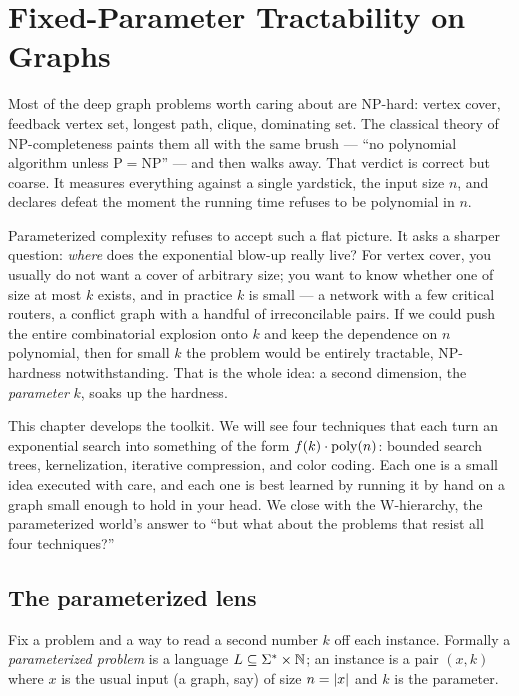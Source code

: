 \chapter{Fixed-Parameter Tractability on Graphs}

Most of the deep graph problems worth caring about are NP-hard: vertex cover, feedback vertex set, longest path, clique, dominating set. The classical theory of NP-completeness paints them all with the same brush --- ``no polynomial algorithm unless P${}={}$NP'' --- and then walks away. That verdict is correct but coarse. It measures everything against a single yardstick, the input size $n$, and declares defeat the moment the running time refuses to be polynomial in $n$.

Parameterized complexity refuses to accept such a flat picture. It asks a sharper question: \emph{where} does the exponential blow-up really live? For vertex cover, you usually do not want a cover of arbitrary size; you want to know whether one of size at most $k$ exists, and in practice $k$ is small --- a network with a few critical routers, a conflict graph with a handful of irreconcilable pairs. If we could push the entire combinatorial explosion onto $k$ and keep the dependence on $n$ polynomial, then for small $k$ the problem would be entirely tractable, NP-hardness notwithstanding. That is the whole idea: a second dimension, the \emph{parameter} $k$, soaks up the hardness.

This chapter develops the toolkit. We will see four techniques that each turn an exponential search into something of the form $f(k)\cdot\operatorname{poly}(n)$: bounded search trees, kernelization, iterative compression, and color coding. Each one is a small idea executed with care, and each one is best learned by running it by hand on a graph small enough to hold in your head. We close with the W-hierarchy, the parameterized world's answer to ``but what about the problems that resist all four techniques?''

\chapterline

\section{The parameterized lens}

Fix a problem and a way to read a second number $k$ off each instance. Formally a \emph{parameterized problem} is a language $L \subseteq \Sigma^* \times \mathbb{N}$; an instance is a pair $(x,k)$ where $x$ is the usual input (a graph, say) of size $n=\lvert x\rvert$ and $k$ is the parameter.

